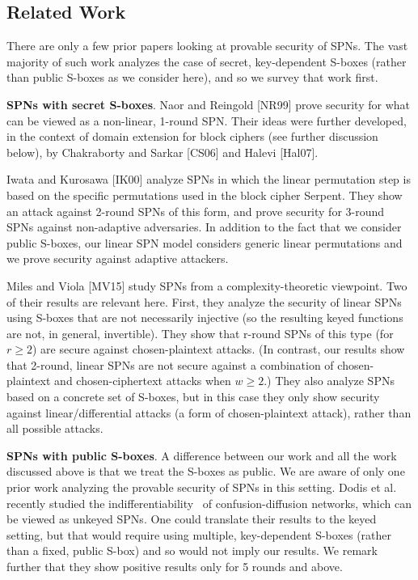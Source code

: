 %
%
%



\subsection{Related Work}


There are only a few prior papers looking at provable security of SPNs. The vast
majority of such work analyzes the case of secret, key-dependent S-boxes (rather
than public S-boxes as we consider here), and so we survey that work first.



{\bf SPNs with secret S-boxes}. Naor and Reingold [NR99] prove security for
what can be viewed as a non-linear, 1-round SPN. Their ideas were further
developed, in the context of domain extension for block ciphers (see further
discussion below), by Chakraborty and Sarkar [CS06] and Halevi [Hal07].


Iwata and Kurosawa [IK00] analyze SPNs in which the linear permutation
step is based on the specific permutations used in the block cipher Serpent. They
show an attack against 2-round SPNs of this form, and prove security for 3-round
SPNs against non-adaptive adversaries. In addition to the fact that we consider
public S-boxes, our linear SPN model considers generic linear permutations and
we prove security against adaptive attackers.

Miles and Viola [MV15] study SPNs from a complexity-theoretic viewpoint.
Two of their results are relevant here. First, they analyze the security of linear
SPNs using S-boxes that are not necessarily injective (so the resulting keyed
functions are not, in general, invertible). They show that r-round SPNs of this
type (for $r\geq 2$) are secure against chosen-plaintext attacks. (In contrast, our
results show that 2-round, linear SPNs are not secure against a combination of
chosen-plaintext and chosen-ciphertext attacks when $w\geq 2$.) They also analyze
SPNs based on a concrete set of S-boxes, but in this case they only show security
against linear/differential attacks (a form of chosen-plaintext attack), rather
than all possible attacks.


{\bf SPNs with public S-boxes}. A difference between our work and all the work
discussed above is that we treat the S-boxes as public. We are aware of only
one prior work analyzing the provable security of SPNs in this setting. Dodis
et al.~\cite{EC:DSSL16} recently studied the indifferentiability~\cite{TCC:MauRenHol04} of confusion-diffusion
networks, which can be viewed as unkeyed SPNs. One could translate
their results to the keyed setting, but that would require using multiple, key-dependent
S-boxes (rather than a fixed, public S-box) and so would not imply
our results. We remark further that they show positive results only for 5 rounds
and above.


